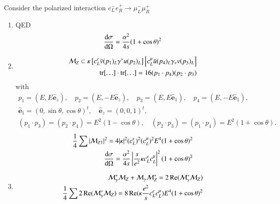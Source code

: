 Consider the polarized interaction $e^-_L e^+_R \rightarrow \mu^-_L \mu_R^+$
\begin{enumerate}
   \item QED
      \begin{align*}
         \dv{\sigma}{\Omega} = \frac{\alpha^2}{4s} (1+\cos \theta)^2 
      \end{align*}
   \item 
      \begin{align*}
         \mathcal{M}_Z \subset \kappa \left[c_L^e \bar{v}(p_1)_L \gamma^\nu u(p_2)_L \right] \left[ c_L^\mu \bar{u}(p_4)_L \gamma_\nu v(p_3)_L \right] \\
         \tr[\dots] \cdot \tr[\dots] = 16 (p_1 \cdot p_4) (p_2 \cdot p_3)
      \end{align*}
      with
      \begin{align*}
         p_1 = (E, E \pmb{\hat{e}}_z), \quad
         p_2 = (E, -E \pmb{\hat{e}}_z), \quad
         p_3 = (E, E \pmb{\hat{e}}_1), \quad
         p_4 = (E, -E \pmb{\hat{e}}_1), \\
         \pmb{\hat{e}}_1 = (0, \sin \theta, \cos \theta)^t , \quad
         \pmb{\hat{e}}_z = (0,0,1)^t, \\
         (p_1 \cdot p_3 ) = (p_2 \cdot p_4) = E^2 (1- \cos \theta) , \quad
         (p_2 \cdot p_3) = (p_1 \cdot p_4) = E^2 (1+\cos \theta).
      \end{align*}
      \begin{align*}
         \frac{1}{4} \sum |\mathcal{M}_{Z1}|^2 = 4 |\kappa|^2 (c_L^e)^2 (c_L^\mu)^2 E^4 (1+\cos \theta)^2 \\
         \dv{\sigma}{\Omega} = \frac{\alpha^2}{4s} \left| \frac{s}{e^2} \kappa c_L^e c_L^\mu \right|^2 (1+\cos \theta)^2
      \end{align*}
   \item
      \begin{align*}
         \mathcal{M}_\gamma^* \mathcal{M}_Z + \mathcal{M}_\gamma \mathcal{M}_Z^* = 2 \Re(\mathcal{M}_\gamma^* \mathcal{M}_Z) \\
         \frac{1}{4} \sum 2 \Re(\mathcal{M}_\gamma^* \mathcal{M}_Z) = 8 \Re( \kappa \frac{e^2}{s} c_L^e c_L^\mu ) E^4 (1+\cos \theta) ^2
      \end{align*}
\end{enumerate}

